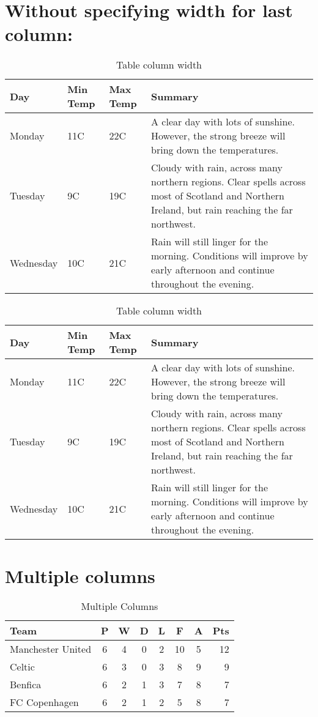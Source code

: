 \section{Without specifying width for last column:}
\begin{table}[h]
\caption{Table column width}
\begin{center}
    \begin{tabular}{ | l | l | l | l |}
    \hline
    Day & Min Temp & Max Temp & Summary \\ \hline
    Monday & 11C & 22C & A clear day with lots of sunshine.
    However, the strong breeze will bring down the temperatures. \\ \hline
    Tuesday & 9C & 19C & Cloudy with rain, across many northern regions. Clear spells
    across most of Scotland and Northern Ireland,
    but rain reaching the far northwest. \\ \hline
    Wednesday & 10C & 21C & Rain will still linger for the morning.
    Conditions will improve by early afternoon and continue
    throughout the evening. \\    \hline
    \end{tabular}
\end{center}

\begin{center}
    \begin{tabular}{ | l | l | l | p{5cm} |}
    \hline
    Day & Min Temp & Max Temp & Summary \\ \hline
    Monday & 11C & 22C & A clear day with lots of sunshine.  
    However, the strong breeze will bring down the temperatures. \\ \hline
    Tuesday & 9C & 19C & Cloudy with rain, across many northern regions. Clear spells
    across most of Scotland and Northern Ireland,
    but rain reaching the far northwest. \\ \hline
    Wednesday & 10C & 21C & Rain will still linger for the morning.
    Conditions will improve by early afternoon and continue
    throughout the evening. \\ \hline
    \end{tabular}
\end{center}
\end{table}


\section{Multiple columns}
\begin{table}[h]
\caption{Multiple Columns}
\begin{tabular}{l|*{6}{c}|r|}
Team              & P & W & D & L & F  & A & Pts \\
\hline
Manchester United & 6 & 4 & 0 & 2 & 10 & 5 & 12  \\
Celtic            & 6 & 3 & 0 & 3 &  8 & 9 &  9  \\
Benfica           & 6 & 2 & 1 & 3 &  7 & 8 &  7  \\
FC Copenhagen     & 6 & 2 & 1 & 2 &  5 & 8 &  7  \\
\end{tabular}
\end{table}

